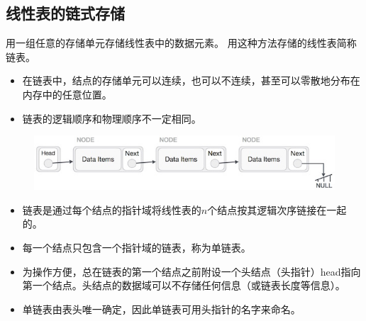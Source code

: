 \subsection{线性表的链式存储}
\begin{frame}\ft{\subsecname}
\begin{dingyi}[链式存储]
用一组任意的存储单元存储线性表中的数据元素。
用这种方法存储的线性表简称\textcolor{acolor3}{链表}。
\end{dingyi}

\pause 
\begin{itemize}
\item 
在链表中，结点的存储单元可以连续，也可以不连续，甚至可以零散地分布在内存中的任意位置。
\item 
链表的逻辑顺序和物理顺序不一定相同。
\end{itemize} 
\end{frame}


\begin{frame}
\begin{figure}
\centering
\includegraphics[width=4.5in]{Chapters/Ch02/Fig/linked_list.jpg}
\end{figure}


\end{frame}

\begin{frame}
\begin{itemize}
\item 
链表是通过每个结点的指针域将线性表的$n$个结点按其逻辑次序链接在一起的。
\item 
每一个结点只包含一个指针域的链表，称为单链表。
\item 
为操作方便，总在链表的第一个结点之前附设一个头结点（头指针）head指向第一个结点。头结点的数据域可以不存储任何信息（或链表长度等信息）。
\item 
单链表由表头唯一确定，因此单链表可用头指针的名字来命名。
\end{itemize}
\end{frame}

